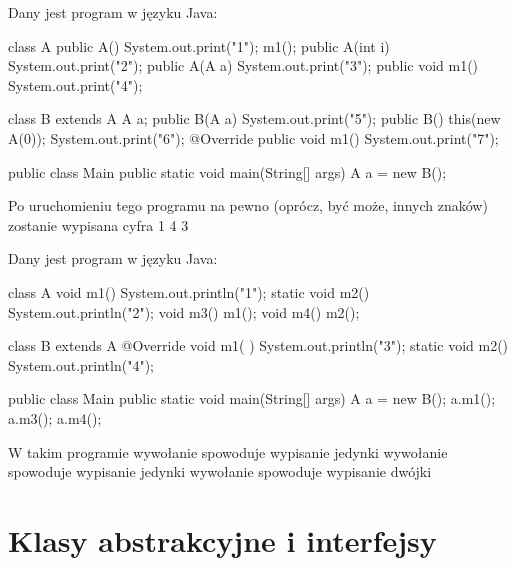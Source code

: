 \begin{problems}
    \prob Dany jest program w języku Java:
    \begin{java}
        class A {
            public A() { System.out.print("1"); m1(); }
            public A(int i) { System.out.print("2"); }
            public A(A a) { System.out.print("3"); }
            public void m1() { System.out.print("4"); }
        }

        class B extends A {
            A a;
            public B(A a) { System.out.print("5"); }
            public B() { this(new A(0)); System.out.print("6"); }
            @Override
            public void m1() { System.out.print("7"); }
        }

        public class Main {
            public static void main(String[] args) {
                A a = new B();
            }
        }
    \end{java}
    Po uruchomieniu tego programu na pewno (oprócz, być może, innych znaków) zostanie wypisana cyfra
    \answers
    {1}
    {4}
    {3}

    \prob Dany jest program w języku Java:
    \begin{java}
        class A {
          void m1() { System.out.println("1"); }
          static void m2() { System.out.println("2"); }
          void m3() { m1(); }
          void m4() { m2(); }
        }
        
        class B extends A {
          @Override
          void m1( ) { System.out.println("3"); }
          static void m2() { System.out.println("4"); }
        }
    
        public class Main {
          public static void main(String[] args) {
            A a = new B();
            a.m1();
            a.m3();
            a.m4();
          }
        }    
    \end{java}
    W takim programie
    \answers
    {wywołanie  spowoduje wypisanie jedynki}
    {wywołanie  spowoduje wypisanie jedynki}
    {wywołanie  spowoduje wypisanie dwójki}
    
\end{problems}

\section{Klasy abstrakcyjne i interfejsy}

